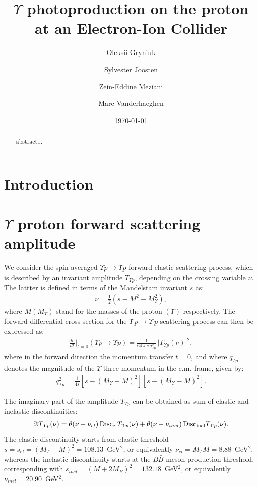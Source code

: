 \documentclass[10pt,prd,aps,nofootinbib,superscriptaddress]{revtex4}
\newcommand{\bea}{\begin{eqnarray}}
\newcommand{\eea}{\end{eqnarray}}
\begin{document}
\title{$\Upsilon$ photoproduction on the proton at an Electron-Ion Collider}
\author{Oleksii Gryniuk}
\author{Sylvester Joosten}
\author{Zein-Eddine Meziani}
\author{Marc Vanderhaeghen}
\noaffiliation
\date{\today}

\begin{abstract}
abstract...
\end{abstract}

\maketitle

\tableofcontents


\section{Introduction}

\newpage

\section{$\Upsilon$ proton forward scattering amplitude}

We consider the spin-averaged $\Upsilon p \to \Upsilon p$ forward elastic scattering process, which is described by an invariant amplitude $T_{\Upsilon p}$, depending on the crossing variable $\nu$. The lattter is defined in terms of the Mandelstam invariant $s$ as:
\bea
\nu = \frac{1}{2} (s - M^2 - M_\Upsilon^2),
\eea
where $M (M_\Upsilon)$ stand for the masses of the proton $(\Upsilon)$ respectively.  
The forward differential cross section for the $\Upsilon \, p \to \Upsilon \, p$ scattering process can then be expressed as:
\bea
\frac{d \sigma}{dt} \biggr|_{t = 0} (\Upsilon p \to \Upsilon p) = \frac{1}{64 \, \pi \, s \, q_{\Upsilon p}^2} \, \big| T_{\Upsilon p}(\nu) \big|^2,
\eea
where in the forward direction the momentum transfer $t = 0$, and where $q_{\Upsilon p}$ denotes the magnitude of the $\Upsilon$ three-momentum in the c.m. frame, given by:
 \bea 
 q_{\Upsilon p}^2  = \frac{1}{4 s} \left[ s - (M_\Upsilon + M)^2 \right] \left[ s - (M_\Upsilon - M)^2 \right].
 \eea 
 
The imaginary part of the amplitude $T_{\Upsilon p}$ can be obtained as sum of elastic and inelastic discontinuities:
\bea
\Im T_{\Upsilon p}(\nu)  = \theta(\nu - \nu_{el}) \,  {\rm Disc}_{\rm el} T_{\Upsilon p}(\nu) +   \theta(\nu - \nu_{inel}) \,  {\rm Disc}_{\rm inel} T_{\Upsilon p}(\nu).
\label{eq:disctot}
\eea
The elastic discontinuity starts from elastic threshold $s = s_{el} = (M_\Upsilon + M)^2 = 108.13$~GeV$^2$, or equivalently $\nu_{el} = M_\Upsilon M = 8.88$~GeV$^2$, whereas the inelastic discontinuity 
starts at the $B \bar B$ meson production threshold, corresponding with $s_{inel} = (M + 2 M_B)^2 = 132.18$~GeV$^2$, or equivalently $\nu_{inel} = 20.90$~GeV$^2$. 
\end{document}
